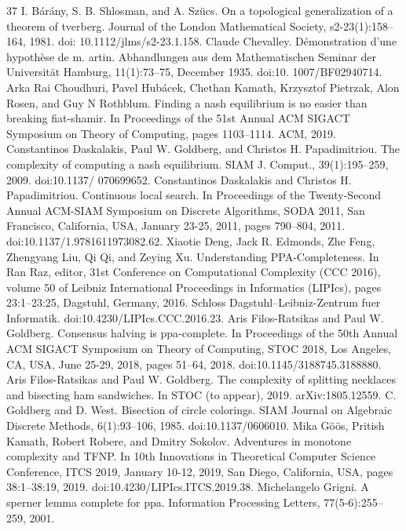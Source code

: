 \begin{thebibliography}{37}
 I. Bárány, S. B. Shlosman, and A. Szücs. On a topological generalization of a theorem of tverberg. Journal of the London Mathematical Society, s2-23(1):158–164, 1981. doi: 10.1112/jlms/s2-23.1.158.
 Claude Chevalley. Démonstration d’une hypothèse de m. artin. Abhandlungen aus dem Mathematischen Seminar der Universität Hamburg, 11(1):73–75, December 1935. doi:10. 1007/BF02940714.
 Arka Rai Choudhuri, Pavel Hubácek, Chethan Kamath, Krzysztof Pietrzak, Alon Rosen, and Guy N Rothblum. Finding a nash equilibrium is no easier than breaking fiat-shamir. In Proceedings of the 51st Annual ACM SIGACT Symposium on Theory of Computing, pages 1103–1114. ACM, 2019.
 Constantinos Daskalakis, Paul W. Goldberg, and Christos H. Papadimitriou. The complexity of computing a nash equilibrium. SIAM J. Comput., 39(1):195–259, 2009. doi:10.1137/ 070699652.
 Constantinos Daskalakis and Christos H. Papadimitriou. Continuous local search. In Proceedings of the Twenty-Second Annual ACM-SIAM Symposium on Discrete Algorithms, SODA 2011, San Francisco, California, USA, January 23-25, 2011, pages 790–804, 2011. doi:10.1137/1.9781611973082.62.
 Xiaotie Deng, Jack R. Edmonds, Zhe Feng, Zhengyang Liu, Qi Qi, and Zeying Xu. Understanding PPA-Completeness. In Ran Raz, editor, 31st Conference on Computational Complexity (CCC 2016), volume 50 of Leibniz International Proceedings in Informatics (LIPIcs), pages 23:1–23:25, Dagstuhl, Germany, 2016. Schloss Dagstuhl–Leibniz-Zentrum fuer Informatik. doi:10.4230/LIPIcs.CCC.2016.23.
 Aris Filos-Ratsikas and Paul W. Goldberg. Consensus halving is ppa-complete. In Proceedings of the 50th Annual ACM SIGACT Symposium on Theory of Computing, STOC 2018, Los Angeles, CA, USA, June 25-29, 2018, pages 51–64, 2018. doi:10.1145/3188745.3188880.
 Aris Filos-Ratsikas and Paul W. Goldberg. The complexity of splitting necklaces and bisecting ham sandwiches. In STOC (to appear), 2019. arXiv:1805.12559.
 C. Goldberg and D. West. Bisection of circle colorings. SIAM Journal on Algebraic Discrete Methods, 6(1):93–106, 1985. doi:10.1137/0606010.
 Mika Göös, Pritish Kamath, Robert Robere, and Dmitry Sokolov. Adventures in monotone complexity and TFNP. In 10th Innovations in Theoretical Computer Science Conference, ITCS 2019, January 10-12, 2019, San Diego, California, USA, pages 38:1–38:19, 2019. doi:10.4230/LIPIcs.ITCS.2019.38.
 Michelangelo Grigni. A sperner lemma complete for ppa. Information Processing Letters, 77(5-6):255–259, 2001.

\end{thebibliography}
